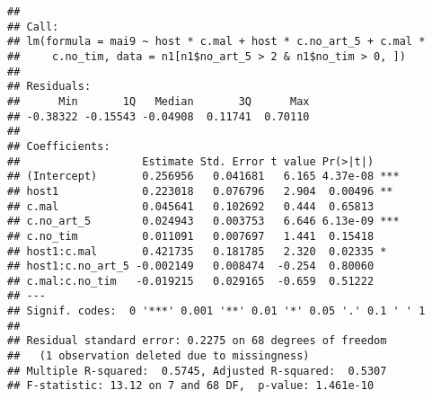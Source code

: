 \documentclass[]{article}
\newenvironment{Shaded}{\begin{snugshade}}{\end{snugshade}}
\newcommand{\KeywordTok}[1]{\textcolor[rgb]{0.13,0.29,0.53}{\textbf{#1}}}
\newcommand{\DataTypeTok}[1]{\textcolor[rgb]{0.13,0.29,0.53}{#1}}
\newcommand{\DecValTok}[1]{\textcolor[rgb]{0.00,0.00,0.81}{#1}}
\newcommand{\StringTok}[1]{\textcolor[rgb]{0.31,0.60,0.02}{#1}}
\newcommand{\OperatorTok}[1]{\textcolor[rgb]{0.81,0.36,0.00}{\textbf{#1}}}
\newcommand{\NormalTok}[1]{#1}
\begin{document}
\begin{verbatim}
## 
## Call:
## lm(formula = mai9 ~ host * c.mal + host * c.no_art_5 + c.mal * 
##     c.no_tim, data = n1[n1$no_art_5 > 2 & n1$no_tim > 0, ])
## 
## Residuals:
##      Min       1Q   Median       3Q      Max 
## -0.38322 -0.15543 -0.04908  0.11741  0.70110 
## 
## Coefficients:
##                   Estimate Std. Error t value Pr(>|t|)    
## (Intercept)       0.256956   0.041681   6.165 4.37e-08 ***
## host1             0.223018   0.076796   2.904  0.00496 ** 
## c.mal             0.045641   0.102692   0.444  0.65813    
## c.no_art_5        0.024943   0.003753   6.646 6.13e-09 ***
## c.no_tim          0.011091   0.007697   1.441  0.15418    
## host1:c.mal       0.421735   0.181785   2.320  0.02335 *  
## host1:c.no_art_5 -0.002149   0.008474  -0.254  0.80060    
## c.mal:c.no_tim   -0.019215   0.029165  -0.659  0.51222    
## ---
## Signif. codes:  0 '***' 0.001 '**' 0.01 '*' 0.05 '.' 0.1 ' ' 1
## 
## Residual standard error: 0.2275 on 68 degrees of freedom
##   (1 observation deleted due to missingness)
## Multiple R-squared:  0.5745, Adjusted R-squared:  0.5307 
## F-statistic: 13.12 on 7 and 68 DF,  p-value: 1.461e-10
\end{verbatim}

\begin{Shaded}
\end{Shaded}
\end{document}
